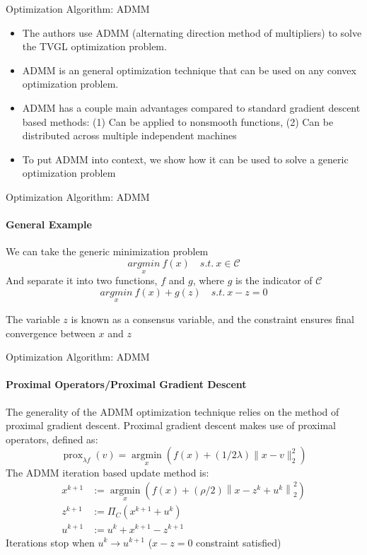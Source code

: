\documentclass{beamer}
\begin{document}
\begin{frame}{Optimization Algorithm: ADMM}
	\begin{itemize}
		\item The authors use ADMM (alternating direction method of multipliers) to solve the TVGL optimization problem.
		\item ADMM is an general optimization technique that can be used on any convex optimization problem. 
		\item ADMM has a couple main advantages compared to standard gradient descent based methods: (1) Can be applied to nonsmooth functions, (2) Can be distributed across multiple independent machines
		\item To put ADMM into context, we show how it can be used to solve a generic optimization problem
	\end{itemize}
\end{frame}

\begin{frame}{Optimization Algorithm: ADMM}
\framesubtitle{General Example}
We can take the generic minimization problem
\[\underset{x}{argmin} \ f(x) \quad s.t. \ x \in \mathcal{C}\]
And separate it into two functions, $f$ and $g$, where $g$ is the indicator of $\mathcal{C}$
\[\underset{x}{argmin} \ f(x) + g(z) \quad s.t. \ x - z = 0\]
\begin{center} The variable $z$ is known as a consensus variable, and the constraint ensures final convergence between $x$ and $z$ \end{center}
\end{frame}

\begin{frame}{Optimization Algorithm: ADMM}
\framesubtitle{Proximal Operators/Proximal Gradient Descent}
The generality of the ADMM optimization technique relies on the method of proximal gradient descent. Proximal gradient descent makes use of proximal operators, defined as:
\[\operatorname{prox}_{\lambda f}(v)=\underset{x}{\operatorname{argmin}}\left(f(x)+(1 / 2 \lambda)\|x-v\|_{2}^{2}\right)\]
The ADMM iteration based update method is:
\begin{align} 
\nonumber x^{k+1} &:=\underset{x}{\operatorname{argmin}}\left(f(x)+(\rho / 2)\left\|x-z^{k}+u^{k}\right\|_{2}^{2}\right) 
\\ \nonumber z^{k+1} &:=\Pi_{C}\left(x^{k+1}+u^{k}\right) 
\\ \nonumber u^{k+1} &:=u^{k}+x^{k+1}-z^{k+1} 
\end{align}
Iterations stop when $u^{k} \xrightarrow{} u^{k+1}$ ($x-z = 0$ constraint satisfied)
\end{frame}
\end{document}

